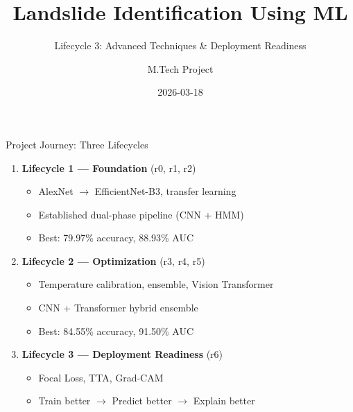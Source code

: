 \documentclass[aspectratio=169]{beamer}
\title{Landslide Identification Using ML}
\subtitle{Lifecycle 3: Advanced Techniques \& Deployment Readiness}
\author{M.Tech Project}
\date{2026-03-18}
\begin{document}
\begin{frame}
    \titlepage
\end{frame}

\begin{frame}{Project Journey: Three Lifecycles}
    \begin{enumerate}
        \item \textbf{Lifecycle 1 --- Foundation} (r0, r1, r2)
            \begin{itemize}
                \item AlexNet $\to$ EfficientNet-B3, transfer learning
                \item Established dual-phase pipeline (CNN + HMM)
                \item Best: 79.97\% accuracy, 88.93\% AUC
            \end{itemize}

        \item \textbf{Lifecycle 2 --- Optimization} (r3, r4, r5)
            \begin{itemize}
                \item Temperature calibration, ensemble, Vision Transformer
                \item CNN + Transformer hybrid ensemble
                \item Best: 84.55\% accuracy, 91.50\% AUC
            \end{itemize}

        \item \textbf{Lifecycle 3 --- Deployment Readiness} (r6)
            \begin{itemize}
                \item Focal Loss, TTA, Grad-CAM
                \item Train better $\to$ Predict better $\to$ Explain better
            \end{itemize}
    \end{enumerate}
\end{frame}
\end{document}
